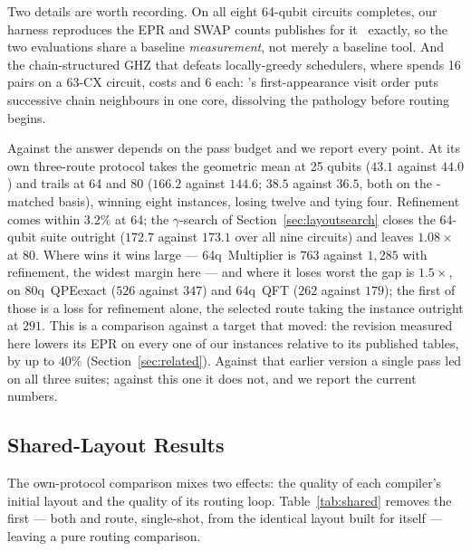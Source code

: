 Two details are worth recording. On all eight 64-qubit circuits
\TeleSABRE{} completes, our harness reproduces the EPR and SWAP counts
\dSABRE{} publishes for it~\cite{lidsabre} exactly, so the two
evaluations share a baseline \emph{measurement}, not merely a baseline
tool. And the
chain-structured GHZ that defeats locally-greedy schedulers, where
\TeleSABRE{} spends 16 pairs on a 63-CX circuit, costs \PORTER{} and
\dSABRE{} 6 each: \PORTER{}'s first-appearance visit order puts
successive chain neighbours in one core, dissolving the pathology
before routing begins.

Against \dSABRE{} the answer depends on the pass budget and we report
every point. At its own three-route protocol \PORTER{} takes the
geometric mean at 25 qubits ($43.1$ against $44.0$) and trails at 64 and
80 ($166.2$ against $144.6$; $38.5$ against $36.5$, both on the
\TeleSABRE{}-matched basis), winning eight instances, losing twelve and
tying four. Refinement comes within $3.2\%$ at 64; the $\gamma$-search
of Section~\ref{sec:layoutsearch} closes the 64-qubit suite outright
($172.7$ against $173.1$ over all nine circuits) and leaves
$1.08\times$ at 80. Where \PORTER{} wins it wins large ---
64q~Multiplier is $763$ against $1{,}285$ with refinement, the widest
margin here --- and where it loses worst the gap is $1.5\times$, on
80q~QPEexact ($526$ against $347$) and 64q~QFT ($262$ against $179$);
the first of those is a loss for refinement alone, the selected route
taking the instance outright at $291$. This is a comparison against a
target that moved: the \dSABRE{} revision measured here lowers its EPR
on every one of our instances relative to its published tables, by up to
$40\%$ (Section~\ref{sec:related}). Against that earlier version a
single \PORTER{} pass led on all three suites; against this one it does
not, and we report the current numbers.

\subsection{Shared-Layout Results}
\label{sec:shared_results}

The own-protocol comparison mixes two effects: the quality of each
compiler's initial layout and the quality of its routing loop.
Table~\ref{tab:shared} removes the first --- both \dSABRE{} and
\PORTER{} route, single-shot, from the identical layout \TeleSABRE{}
built for itself --- leaving a pure routing comparison.

